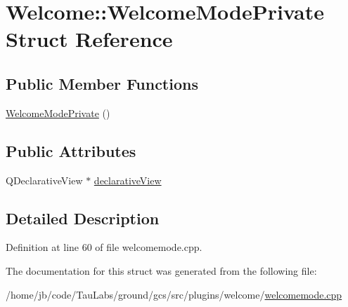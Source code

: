 \hypertarget{struct_welcome_1_1_welcome_mode_private}{\section{\-Welcome\-:\-:\-Welcome\-Mode\-Private \-Struct \-Reference}
\label{struct_welcome_1_1_welcome_mode_private}
}
\subsection*{\-Public \-Member \-Functions}
\begin{DoxyCompactItemize}
\item 
\hyperlink{group___welcome_plugin_ga75edcc8b045b7553f7bb09bde3a0a491}{\-Welcome\-Mode\-Private} ()
\end{DoxyCompactItemize}
\subsection*{\-Public \-Attributes}
\begin{DoxyCompactItemize}
\item 
\-Q\-Declarative\-View $\ast$ \hyperlink{group___welcome_plugin_gaf068be1c7d6cf926c50641b99392b563}{declarative\-View}
\end{DoxyCompactItemize}


\subsection{\-Detailed \-Description}


\-Definition at line 60 of file welcomemode.\-cpp.



\-The documentation for this struct was generated from the following file\-:\begin{DoxyCompactItemize}
\item 
/home/jb/code/\-Tau\-Labs/ground/gcs/src/plugins/welcome/\hyperlink{welcomemode_8cpp}{welcomemode.\-cpp}\end{DoxyCompactItemize}
